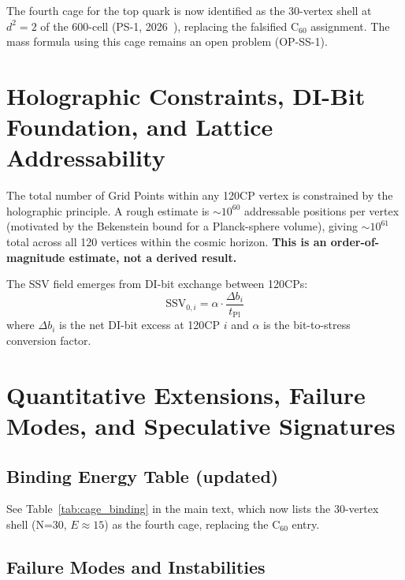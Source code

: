\documentclass[11pt]{article}
\begin{document}
The fourth cage for the top quark is now identified as the 30-vertex
shell at $d^2 = 2$ of the 600-cell (PS-1, 2026~\cite{ps1}), replacing the
falsified C$_{60}$ assignment.  The mass formula using this cage
remains an open problem (OP-SS-1).

\appendix

\section{Holographic Constraints, DI-Bit Foundation, and Lattice Addressability}

The total number of Grid Points within any 120CP vertex is constrained
by the holographic principle.  A rough estimate is ${\sim}10^{60}$
addressable positions per vertex (motivated by the Bekenstein bound
for a Planck-sphere volume), giving ${\sim}10^{61}$ total across all 120
vertices within the cosmic horizon.  \textbf{This is an order-of-magnitude
estimate, not a derived result.}

The SSV field emerges from DI-bit exchange between 120CPs:
\begin{equation}
\text{SSV}_{0,i} = \alpha \cdot \frac{\Delta b_i}{t_{\text{Pl}}}
\end{equation}
where $\Delta b_i$ is the net DI-bit excess at 120CP $i$ and $\alpha$
is the bit-to-stress conversion factor.

\section{Quantitative Extensions, Failure Modes, and Speculative Signatures}

\subsection{Binding Energy Table (updated)}

See Table~\ref{tab:cage_binding} in the main text, which now lists the
30-vertex shell (N=30, $E \approx 15$) as the fourth cage, replacing
the C$_{60}$ entry.

\subsection{Failure Modes and Instabilities}
\end{document}
